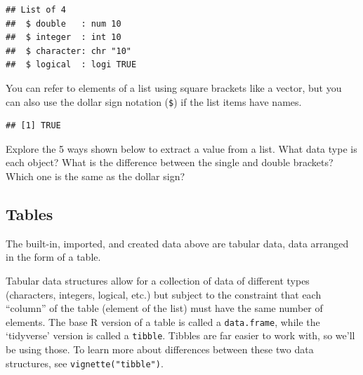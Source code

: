 \documentclass[
  oneside]{book}
\newenvironment{Shaded}{\begin{snugshade}}{\end{snugshade}}
\newcommand{\DecValTok}[1]{\textcolor[rgb]{0.00,0.00,0.81}{#1}}
\newcommand{\NormalTok}[1]{#1}
\newcommand{\OtherTok}[1]{\textcolor[rgb]{0.56,0.35,0.01}{#1}}
\newcommand{\SpecialCharTok}[1]{\textcolor[rgb]{0.00,0.00,0.00}{#1}}
\newcommand{\StringTok}[1]{\textcolor[rgb]{0.31,0.60,0.02}{#1}}
\begin{document}
\begin{verbatim}
## List of 4
##  $ double   : num 10
##  $ integer  : int 10
##  $ character: chr "10"
##  $ logical  : logi TRUE
\end{verbatim}

You can refer to elements of a list using square brackets like a vector, but you can also use the dollar sign notation (\texttt{\$}) if the list items have names.

\begin{Shaded}
\end{Shaded}

\begin{verbatim}
## [1] TRUE
\end{verbatim}

\begin{try}

Explore the 5 ways shown below to extract a value from a list. What data type is each object? What is the difference between the single and double brackets? Which one is the same as the dollar sign?

\begin{Shaded}
\end{Shaded}

\end{try}

\hypertarget{tables-data}{%
\subsection{Tables}\label{tables-data}}

The built-in, imported, and created data above are tabular data, data arranged in the form of a table.

Tabular data structures allow for a collection of data of different types (characters, integers, logical, etc.) but subject to the constraint that each ``column'' of the table (element of the list) must have the same number of elements. The base R version of a table is called a \texttt{data.frame}, while the `tidyverse' version is called a \texttt{tibble}. Tibbles are far easier to work with, so we'll be using those. To learn more about differences between these two data structures, see \texttt{vignette("tibble")}.
\end{document}
